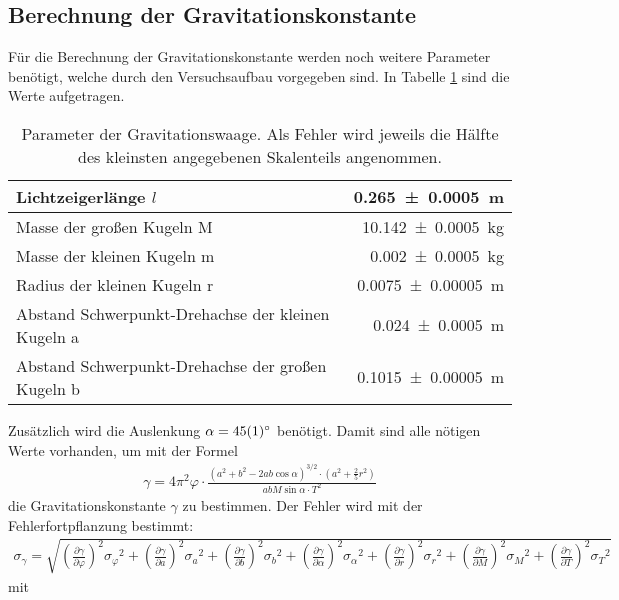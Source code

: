 \subsection{Berechnung der Gravitationskonstante}
Für die Berechnung der Gravitationskonstante werden noch weitere Parameter benötigt, welche durch den Versuchsaufbau vorgegeben sind. In Tabelle \ref{tab:2} sind die Werte aufgetragen.
\begin{table}[!htpb]
\begin{tabular}{|l|r|}
\hline 
Lichtzeigerlänge $l$ & \SI{0,265\pm0,0005}{\meter} \\ 
\hline 
Masse der großen Kugeln M & \SI{10,142\pm0,0005}{\kilogram} \\ 
\hline 
Masse der kleinen Kugeln m & \SI{0,002\pm0,0005}{\kilogram} \\ 
\hline 
Radius der kleinen Kugeln r & \SI{0,0075\pm0,00005}{\meter} \\ 
\hline 
Abstand Schwerpunkt-Drehachse der kleinen Kugeln a & \SI{0,024\pm0,0005}{\meter} \\ 
\hline
Abstand Schwerpunkt-Drehachse der großen Kugeln b & \SI{0,1015\pm0,00005}{\meter} \\ 
\hline 
\end{tabular}
\caption{Parameter der Gravitationswaage. Als Fehler wird jeweils die Hälfte des kleinsten angegebenen Skalenteils angenommen.}
\label{tab:2}
\end{table}
\newpage
Zusätzlich wird die Auslenkung $\alpha=\SI{45\pm1}{\degree}$ benötigt. Damit sind alle nötigen Werte vorhanden, um mit der Formel
\begin{align}
\gamma=4\pi^2\varphi\cdot\frac{\left(a^2+b^2-2ab\cos\alpha\right)^{3/2}\cdot\left(a^2+\frac{2}{5}r^2\right)}{abM{\sin\alpha\cdot{T}^2}}
\end{align}
die Gravitationskonstante $\gamma$ zu bestimmen. Der Fehler wird mit der Fehlerfortpflanzung bestimmt:
\begin{align}
\sigma_\gamma=\sqrt{\left(\frac{\partial\gamma}{\partial\varphi}\right)^2{\sigma_\varphi}^2+\left(\frac{\partial\gamma}{\partial{a}}\right)^2{\sigma_a}^2+\left(\frac{\partial\gamma}{\partial{b}}\right)^2{\sigma_b}^2+\left(\frac{\partial\gamma}{\partial\alpha}\right)^2{\sigma_\alpha}^2+\left(\frac{\partial\gamma}{\partial{r}}\right)^2{\sigma_r}^2+\left(\frac{\partial\gamma}{\partial{M}}\right)^2{\sigma_M}^2+\left(\frac{\partial\gamma}{\partial{T}}\right)^2{\sigma_T}^2}
\end{align}
mit
